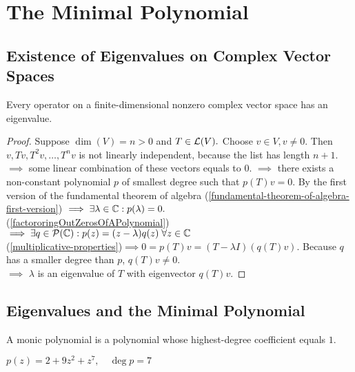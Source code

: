 \section{The Minimal Polynomial}
\subsection{Existence of Eigenvalues on Complex Vector Spaces}

\begin{thm}
  Every operator on a finite-dimensional nonzero complex vector space has an eigenvalue.
\end{thm}
\begin{proof}
  Suppose $\dim(V)=n>0$ and $T\in \mathcal{L}(V).$ Choose $v\in V, v\neq0$. Then $v, Tv, T^2v, \dots, T^nv$ is not linearly independent, because the list has length $n+1$. $\implies$ some linear combination of these vectors equals to $0$. $\implies$ there exists a non-constant polynomial $p$ of smallest degree such that $p(T)v = 0$. By the first version of the fundamental theorem of algebra (\ref{fundamental-theorem-of-algebra-first-version}) $\implies \exists \lambda \in \mathbb{C}: p(\lambda) = 0.$\\
  (\ref{factororingOutZerosOfAPolynomial})$\implies \exists q \in \mathcal {P} (\mathbb{C}): p(z) = (z-\lambda)  q(z) \; \forall z \in \mathbb{C}$ \\
  (\ref{multiplicative-properties})$\implies 0=p(T)v=(T-\lambda I) (q(T)v)$. Because $q$ has a smaller degree than $p$, $q(T)v \neq 0$. \\
  $\implies$ $\lambda$ is an eigenvalue of $T$ with eigenvector $q(T)v$.
\end{proof}

\subsection{Eigenvalues and the Minimal Polynomial}
\begin{mydef}
  A monic polynomial is a polynomial whose highest-degree coefficient equals $1$.
\end{mydef}
\begin{example}
  $p(z)=2+9z^2+z^7, \quad \deg p = 7$
\end{example}

